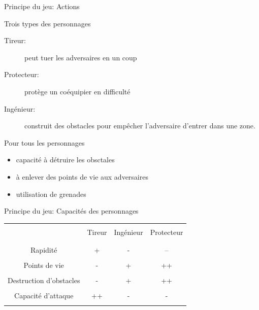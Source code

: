 \documentclass[10pt]{beamer}
\begin{document}
\begin{frame}{Principe du jeu: Actions}

\begin{block}{Trois types des personnages}
\begin{description}
\item[Tireur:] peut tuer les adversaires en un coup 
\item[Protecteur:] prot\`ege un co\'equipier en difficult\'e 
\item[Ing\'enieur:] construit des obstacles pour emp\^echer l'adversaire d'entrer dans une zone.
\end{description}
\end{block}

\bigskip

\begin{block}{Pour tous les personnages}
\begin{itemize}
\item capacit\'e \`a d\'etruire les obsctales
\item \`a enlever des points de vie aux adversaires
\item utilisation de grenades
\end{itemize}
\end{block}

\end{frame}

\begin{frame}{Principe du jeu: Capacit\'es des personnages}
\begin{tabular}{|c||c|c|c|}
\hline
&&&\\
					& Tireur & Ing\'enieur & Protecteur \\
&&&\\
\hline
&&&\\
Rapidit\'e 				& +        & -                 & --               \\
&&&\\
Points de vie			& -         & +                &++               \\
&&&\\
Destruction d'obstacles	& -         & +                & ++               \\
&&&\\
Capacit\'e d'attaque		& ++      & -                 & -                  \\
&&&\\
\hline
\end{tabular}

\end{frame}
\end{document}
